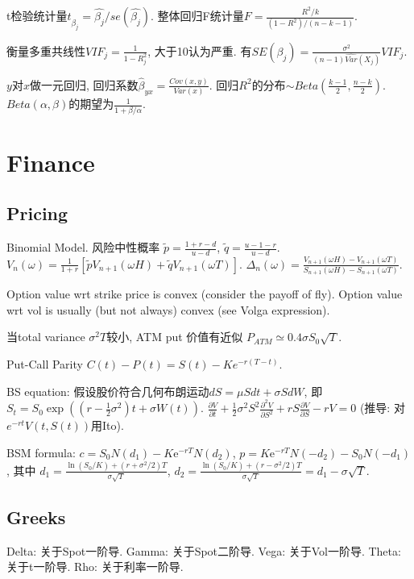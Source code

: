 \documentclass[UTF8]{ctexart}
\begin{document}
t检验统计量$t_{\hat{\beta_j}} = \hat{\beta_j}/se(\hat{\beta_j})$.
整体回归F统计量$F=\frac{R^2/k}{(1-R^2)/(n-k-1)}$.

衡量多重共线性$VIF_j = \frac{1}{1-R_j^2}$, 大于10认为严重.
有$SE(\beta_j)=\frac{\sigma^2}{(n-1)\hat{Var}(X_j)}VIF_j$.

$y$对$x$做一元回归, 回归系数$\hat{\beta}_{yx}=\frac{Cov(x,y)}{Var(x)}$. 回归$R^2$的分布$\sim Beta(\frac{k-1}{2},\frac{n-k}{2})$. $Beta(\alpha,\beta)$的期望为$\frac{1}{1+\beta/\alpha}$.


\section{Finance}

\subsection{Pricing}

Binomial Model.
风险中性概率 $\widetilde{p} = \frac{1+r-d}{u-d}$, $\widetilde{q} = \frac{u-1-r}{u-d}$.
$V_n(\omega)=\frac{1}{1+r}[\widetilde{p}V_{n+1}(\omega H) + \widetilde{q}V_{n+1}(\omega T)]$.
$\Delta_n(\omega) = \frac{V_{n+1}(\omega H)-V_{n+1}(\omega T)}{S_{n+1}(\omega H)-S_{n+1}(\omega T)}$.


Option value wrt strike price is convex (consider the payoff of fly).
Option value wrt vol is usually (but not always) convex (see Volga expression).

当total variance $\sigma^2 T$较小, ATM put 价值有近似 $P_{ATM}\simeq 0.4\sigma S_0\sqrt{T}$.

Put-Call Parity $C(t)-P(t) = S(t) - Ke^{-r(T-t)}$.

BS equation: 假设股价符合几何布朗运动$dS=\mu S d t+\sigma S dW$, 即$S_t = S_0 \exp ((r-\frac{1}{2}\sigma^2)t+\sigma W(t))$.
$\frac{\partial V}{\partial t}+\frac{1}{2} \sigma^{2} S^{2} \frac{\partial^{2} V}{\partial S^{2}}+r S \frac{\partial V}{\partial S}-r V=0$
(推导: 对$e^{-rt}V(t,S(t))$用Ito).

BSM formula:
$c=S_0 N\left(d_1\right)-K \mathrm{e}^{-r T} N\left(d_2\right) $,
$p=K \mathrm{e}^{-r T} N\left(-d_2\right)-S_0 N\left(-d_1\right) $, 其中
$d_1=\frac{\ln \left(S_0 / K\right)+\left(r+\sigma^2 / 2\right) T}{\sigma \sqrt{T}} $,
$d_2=\frac{\ln \left(S_0 / K\right)+\left(r-\sigma^2 / 2\right) T}{\sigma \sqrt{T}}=d_1-\sigma \sqrt{T}$.


\subsection{Greeks}
Delta: 关于Spot一阶导.
Gamma: 关于Spot二阶导.
Vega: 关于Vol一阶导.
Theta: 关于t一阶导.
Rho: 关于利率一阶导.
\end{document}
